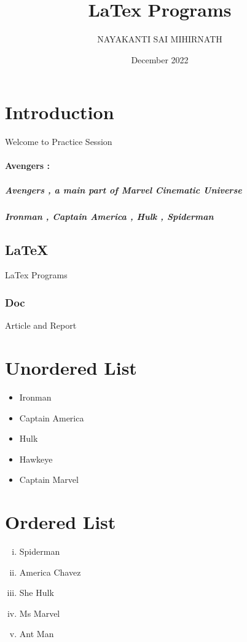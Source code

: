 \documentclass[a4paper,15pt]{article}
\title{LaTex Programs}
\author{NAYAKANTI SAI MIHIRNATH}
\date{December 2022}
\begin{document}
	\maketitle
	\pagebreak
	\tableofcontents
	\newpage
	\section{Introduction}
	Welcome to Practice Session
	\paragraph{Avengers : }
	\subparagraph{Avengers , a main part of Marvel Cinematic Universe}
	\subparagraph{Ironman , Captain America , Hulk , Spiderman}
	\subsection{LaTeX}
	LaTex Programs
	\subsubsection{Doc}
	Article and Report
	\newpage
	\section{Unordered List}
	\begin{itemize}
		\item Ironman
		\item Captain America
		\item Hulk
		\item Hawkeye
		\item Captain Marvel
	\end{itemize}
	\section{Ordered List}
	\begin{enumerate}[(i)]
		\item Spiderman
		\item America Chavez
		\item She Hulk
		\item Ms Marvel
		\item Ant Man
	\end{enumerate}
	\pagebreak
\end{document}
